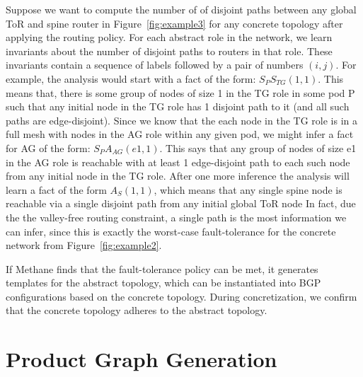\documentclass[numbers, 10pt, preprint]{sigplanconf}
\newcommand{\sysname}{{\small \sf Methane}\xspace}
\begin{document}
Suppose we want to compute the number of of disjoint paths between any global ToR and spine router in Figure~\ref{fig:example3} for any concrete topology after applying the routing policy.
For each abstract role in the network, we learn invariants about the number of disjoint paths to routers in that role. These invariants contain a sequence of labels followed by a pair of numbers $(i,j)$. For example, the analysis would start with a fact of the form: $S_P S_{TG} (1,1)$. This means that, there is some group of nodes of size 1 in the TG role in some pod P such that any initial node in the TG role has 1 disjoint path to it (and all such paths are edge-disjoint). Since we know that the each node in the TG role is in a full mesh with nodes in the AG role within any given pod, we might infer a fact for AG of the form: $S_P A_{AG}(e1,1)$. This says that any group of nodes of size e1 in the AG role is reachable with at least 1 edge-disjoint path to each such node from any initial node in the TG role.
%
After one more inference the analysis will learn a fact of the form $A_{S}(1,1)$, which means that any single spine node is reachable via a single disjoint path from any initial global ToR node 
In fact, due the the valley-free routing constraint, a single path is the most information we can infer, since this is exactly the worst-case fault-tolerance for the concrete network from Figure~\ref{fig:example2}.

If \sysname finds that the fault-tolerance policy can be met, it generates templates for the abstract topology, which can be instantiated into BGP configurations based on the concrete topology. During concretization, we confirm that the concrete topology adheres to the abstract topology.

%
%
%


%
%
%
%

\section{Product Graph Generation}
\label{sec:language}
\end{document}
